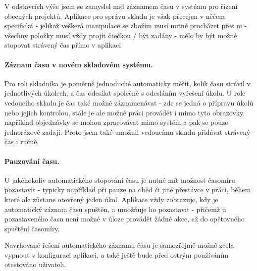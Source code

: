 V odstavcích výše jsem se zamyslel nad záznamem času v systému pro řízení obecných projektů. Aplikace pro správu skladu je však přecejen v něčem specifická - jelikož veškerá manipulace se zbožím musí nutně procházet přes ni - všechny položky musí vždy projít čtečkou / být zadány - mělo by být možné stopovat strávený čas přímo v aplikaci

\paragraph{Záznam času v novém skladovém systému.} Pro roli skladníka je poměrně jednoduché automaticky měřit, kolik času strávil v jednotlivých úkolech, a čas odesílat společně s odesláním vyřešení úkolu. U role vedoucího skladu je čas také možné záznamenávat - zde se jedná o přípravu úkolů nebo jejich kontrolou, stále je ale možné práci provádět i mimo tyto obrazovky, například objednávky se mohou zpracovávat mimo systém a pak se pouze jednorázově zadají. Proto jsem také umožnil vedoucímu skladu přidávat strávený čas i ručně.

\paragraph{Pauzování času.} U jakéhokoliv automatického stopování času je nutné mít možnost časomíru pozastavit - typicky například při pauze na oběd či jiné přestávce v práci, během které ale zůstane otevřený jeden úkol. Aplikace vždy zobrazuje, kdy je automatický záznam času spuštěn, a umožňuje ho pozastavit - přičemž u pozastaveného času není možné v úloze provádět žádné akce, až do opětovného spuštění časomíry.

Navrhované řešení automatického záznamu času je samozřejmě možné zcela vypnout v konfiguraci aplikaci, a také ještě bude před ostrým používáním otestováno uživateli. 


% 
% 
% 
% 
% 
% 
% 
% 
% 


